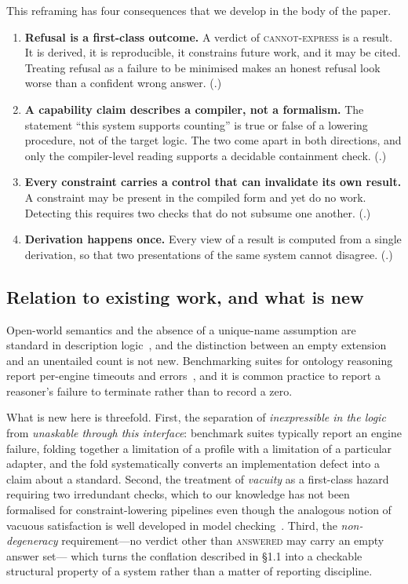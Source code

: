 \documentclass[11pt,a4paper]{article}
\theoremstyle{plain}
\theoremstyle{definition}
\theoremstyle{remark}
\newcommand{\vans}{\textsc{answered}}
\newcommand{\vexp}{\textsc{cannot-express}}
\begin{document}
This reframing has four consequences that we develop in the body of the paper.

\begin{enumerate}[label=(C\arabic*),leftmargin=*]
\item \textbf{Refusal is a first-class outcome.} A verdict of \vexp{} is a
      result. It is derived, it is reproducible, it constrains future work,
      and it may be cited. Treating refusal as a failure to be minimised makes
      an honest refusal look worse than a confident wrong answer.
      (.)
\item \textbf{A capability claim describes a compiler, not a formalism.} The
      statement ``this system supports counting'' is true or false of a
      lowering procedure, not of the target logic. The two come apart in both
      directions, and only the compiler-level reading supports a decidable
      containment check. (.)
\item \textbf{Every constraint carries a control that can invalidate its own
      result.} A constraint may be present in the compiled form and yet do no
      work. Detecting this requires two checks that do not subsume one
      another. (.)
\item \textbf{Derivation happens once.} Every view of a result is computed
      from a single derivation, so that two presentations of the same system
      cannot disagree. (.)
\end{enumerate}

\subsection{Relation to existing work, and what is new}

Open-world semantics and the absence of a unique-name assumption are standard
in description logic~\citep{BaaderCalvanese2017,Horrocks2003}, and the
distinction between an empty extension and an unentailed count is not
new. Benchmarking suites for ontology reasoning report per-engine timeouts and
errors~\citep{Guo2005LUBM,Singh2020OWL2Bench,Parsia2017ORE}, and it is common
practice to report a reasoner's failure to terminate rather than to record a
zero.

What is new here is threefold. First, the separation of \emph{inexpressible in
the logic} from \emph{unaskable through this interface}: benchmark suites
typically report an engine failure, folding together a limitation of a profile
with a limitation of a particular adapter, and the fold systematically
converts an implementation defect into a claim about a standard. Second, the
treatment of \emph{vacuity} as a first-class hazard requiring two irredundant
checks, which to our knowledge has not been formalised for
constraint-lowering pipelines even though the analogous notion of vacuous
satisfaction is well developed in model
checking~\citep{Beer2001,Kupferman2003}. Third, the \emph{non-degeneracy}
requirement---no verdict other than \vans{} may carry an empty answer set---
which turns the conflation described in \S1.1 into a checkable structural
property of a system rather than a matter of reporting discipline.
\end{document}
